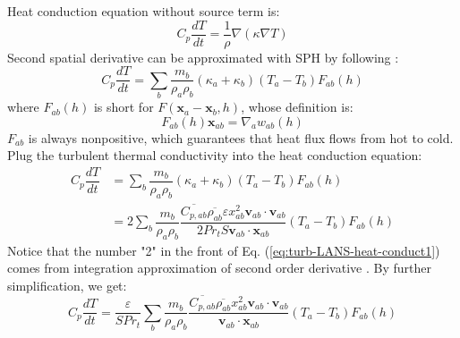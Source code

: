 \documentclass[gmd, manuscript]{copernicus}
\begin{document}
Heat conduction equation without source term is:
\begin{equation}
C_p \dfrac{dT}{dt} = \dfrac{1}{\rho} \nabla \left(\kappa \nabla T\right)
\end{equation}
Second spatial derivative can be approximated with SPH by following \citet{monaghan2005smoothed}: 
\begin{equation}
C_p \dfrac{dT}{dt} = \sum_b \dfrac{m_b}{\rho_a \rho_b} \left(\kappa_a + \kappa_b\right) \left(T_a - T_b\right) F_{ab} \left(h\right)
\end{equation}
where $F_{ab} (h)$ is short for $F \left( \textbf{x}_a - \textbf{x}_b, h \right)$, whose definition is:
\begin{equation}
F_{ab}(h) \textbf{x}_{ab} = \nabla_a w_{ab} \left( h \right)
\end{equation}
$F_{ab}$ is always nonpositive, which guarantees that heat flux flows from hot to cold. 
Plug the turbulent thermal conductivity into the heat conduction equation:
\begin{equation}
\begin{split}
C_p \dfrac{dT}{dt}
& = \sum_b \dfrac{m_b}{\rho_a \rho_b} \left(\kappa_a + \kappa_b\right) \left(T_a - T_b\right) F_{ab} \left(h\right) \\
 &= 2 \sum_b \dfrac{m_b}{\rho_a \rho_b} \dfrac{\overline{C_{p,ab}} \overline{\rho_{ab}} \varepsilon x_{ab}^2 \textbf{v}_{ab} \cdot \textbf{v}_{ab}}{2 Pr_t  S \textbf{v}_{ab} \cdot \textbf{x}_{ab} } \left(T_a - T_b\right) F_{ab} \left(h\right)
\end{split}
\label{eq:turb-LANS-heat-conduct1}
\end{equation}
Notice that the number "2" in the front of Eq. (\ref{eq:turb-LANS-heat-conduct1}) comes from integration approximation of second order derivative \citep {cleary1999conduction}. By further simplification, we get:
\begin{equation}
C_p \dfrac{dT}{dt}
 =\dfrac{\varepsilon}{S  Pr_t}  \sum_b \dfrac{m_b}{\rho_a \rho_b} \dfrac{\overline{C_{p,ab}} \overline{\rho_{ab}} x_{ab}^2 \textbf{v}_{ab} \cdot \textbf{v}_{ab}}{\textbf{v}_{ab} \cdot \textbf{x}_{ab}} \left(T_a - T_b\right) F_{ab} \left(h\right)
\end{equation}
\end{document}
